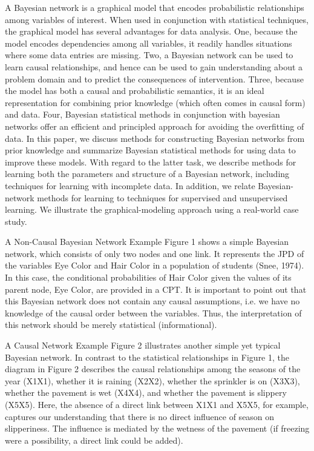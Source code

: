 A Bayesian network is a graphical model that encodes probabilistic relationships among variables of interest. When used in conjunction with statistical techniques, the graphical model has several advantages for data analysis. One, because the model encodes dependencies among all variables, it readily handles situations where some data entries are missing. Two, a Bayesian network can be used to learn causal relationships, and hence can be used to gain understanding about a problem domain and to predict the consequences of intervention. Three, because the model has both a causal and probabilistic semantics, it is an ideal representation for combining prior knowledge (which often comes in causal form) and data. Four, Bayesian statistical methods in conjunction with bayesian networks offer an efficient and principled approach for avoiding the overfitting of data. In this paper, we discuss methods for constructing Bayesian networks from prior knowledge and summarize Bayesian statistical methods for using data to improve these models. With regard to the latter task, we describe methods for learning both the parameters and structure of a Bayesian network, including techniques for learning with incomplete data. In addition, we relate Bayesian-network methods for learning to techniques for supervised and unsupervised learning. We illustrate the graphical-modeling approach using a real-world case study.

A Non-Causal Bayesian Network Example
Figure 1 shows a simple Bayesian network, which consists of only two nodes and one link. It represents the JPD of the variables Eye Color and Hair Color in a population of students (Snee, 1974). In this case, the conditional probabilities of Hair Color given the values of its parent node, Eye Color, are provided in a CPT. It is important to point out that this Bayesian network does not contain any causal assumptions, i.e. we have no knowledge of the causal order between the variables. Thus, the interpretation of this network should be merely statistical (informational).



A Causal Network Example
Figure 2 illustrates another simple yet typical Bayesian network. In contrast to the statistical relationships in Figure 1, the diagram in Figure 2 describes the causal relationships among the seasons of the year (X1X1), whether it is raining (X2X2), whether the sprinkler is on (X3X3), whether the pavement is wet (X4X4), and whether the pavement is slippery (X5X5). Here, the absence of a direct link between X1X1 and X5X5, for example, captures our understanding that there is no direct influence of season on slipperiness. The influence is mediated by the wetness of the pavement (if freezing were a possibility, a direct link could be added).



